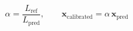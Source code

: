 \documentclass[11pt]{article}
\begin{document}
\begin{equation*}
\alpha = \frac{L_{\text{ref}}}{L_{\text{pred}}}, \qquad \mathbf{x}_{\text{calibrated}} = \alpha\, \mathbf{x}_{\text{pred}}\tag{1}
\end{equation*}
\end{document}
